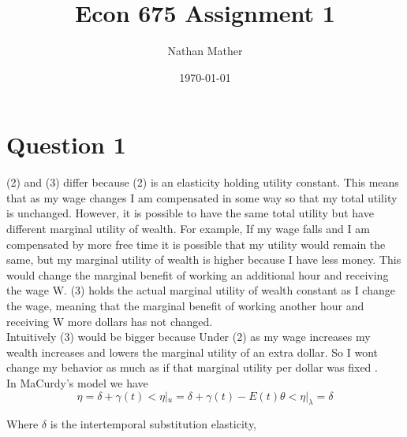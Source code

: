 \documentclass[11pt]{article}
\title{Econ 675 Assignment 1} %
\author{Nathan Mather} %
\date{\today} %
\begin{document}
	
\maketitle %

\setcounter{tocdepth}{2} %

\tableofcontents %



\section{Question 1}

(2) and (3) differ because (2) is an elasticity holding utility constant. This means that as my wage changes I am compensated in some way so that my total utility is unchanged. However, it is possible to have the same total utility but have different marginal utility of wealth. For example, If my wage falls and I am compensated by more free time it is possible that my utility would remain the same, but my marginal utility of wealth is higher because I have less money. This would change the marginal benefit of working an additional hour and receiving the wage W. (3) holds the actual marginal utility of wealth constant as I change the wage, meaning that the marginal benefit of working another hour and receiving W more dollars has not changed. \\

Intuitively (3) would be bigger because Under (2) as my wage increases my wealth increases and lowers the marginal utility of an extra dollar. So I wont change my behavior as much as if that marginal utility per dollar was fixed . \\

In MaCurdy's model we have 
$$ \eta = \delta+\gamma(t) < \eta |_u = \delta + \gamma(t) -E(t) \theta < \eta|_{\lambda} = \delta
$$

Where $\delta$ is the intertemporal substitution elasticity, 





\end{document}
